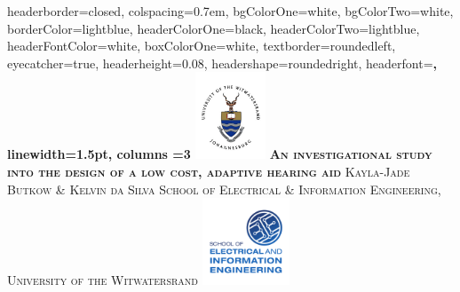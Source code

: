 \documentclass[landscape,a1paper,fontscale=0.5]{baposter} %
\begin{document}
\begin{poster}
{
headerborder=closed, %
colspacing=0.7em, %
bgColorOne=white, %
bgColorTwo=white, %
borderColor=lightblue, %
headerColorOne=black, %
headerColorTwo=lightblue, %
headerFontColor=white, %
boxColorOne=white, %
textborder=roundedleft, %
eyecatcher=true, %
headerheight=0.08\textheight, %
headershape=roundedright, %
headerfont=\Large\bf\textsc, %
linewidth=1.5pt, %
columns =3
}
%
{\includegraphics[height=7em]{wits.jpg}} %
{\bf\textsc{An investigational study into the design of a low cost, adaptive hearing aid}\vspace{0.3em}} %
{\textsc{ Kayla-Jade Butkow \& Kelvin da Silva \hspace{12pt} {\small School of Electrical \& Information Engineering, University of the Witwatersrand}}} %
{\includegraphics[height=7em]{EIE.pdf}} %


\end{poster}
\end{document}
